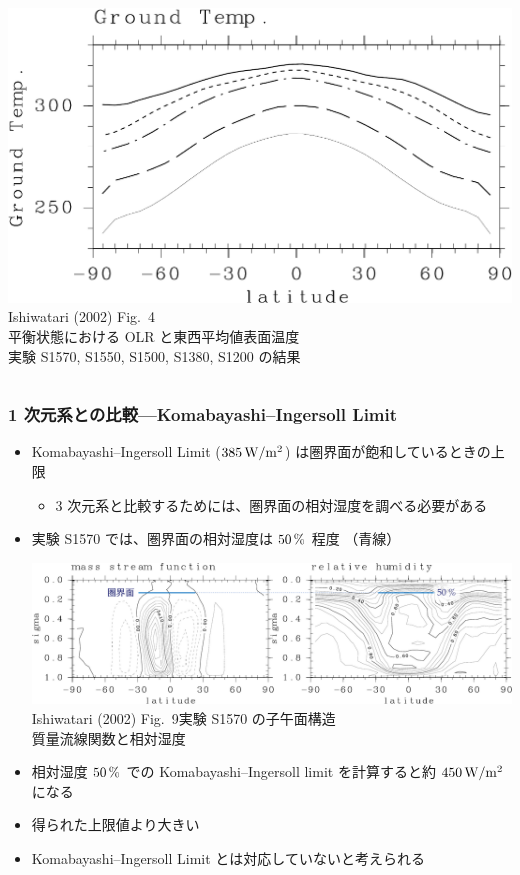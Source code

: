 \documentclass[aspectratio=149,9pt,fleqn]{beamer}
\begin{document}
\begin{frame}
\begin{columns}[T,onlytextwidth]
\begin{column}{.4\textwidth}
			\includegraphics[width=\textwidth]{./fig/Tg-meris.kps-crop.pdf}\\
			\scriptsize Ishiwatari \etal (2002) Fig.\ 4\\
			平衡状態における OLR と東西平均値表面温度\\
			実験 S1570, S1550, S1500, S1380, S1200 の結果
		\end{column}
	\end{columns}
\end{frame}

\begin{frame}
	\frametitle{1 次元系との比較---Komabayashi--Ingersoll Limit}
	\begin{itemize}
		\item Komabayashi--Ingersoll Limit (\(385\hmu{W/m^2}\)) は圏界面が飽和しているときの上限
			\begin{itemize}
				\item 3 次元系と比較するためには、圏界面の相対湿度を調べる必要がある
			\end{itemize}
		\item 実験 S1570 では、圏界面の相対湿度は \(50\hmu{\%}\) 程度
			\textcolor[cmyk]{1,1,0,0}{（青線）}
			\begin{center}
				\includegraphics[width=.7\textwidth]{zu-ao.pdf}\\
					\scriptsize Ishiwatari \etal (2002) Fig.\ 9\quad 実験 S1570 の子午面構造\\
					質量流線関数と相対湿度
			\end{center}
		\item 相対湿度 \(50\hmu{\%}\) での
			Komabayashi--Ingersoll limit を計算すると約 \(450\hmu{W/m^2}\) になる
		\item 得られた上限値より大きい
		\item Komabayashi--Ingersoll Limit とは対応していないと考えられる
	\end{itemize}
\end{frame}
\end{document}
